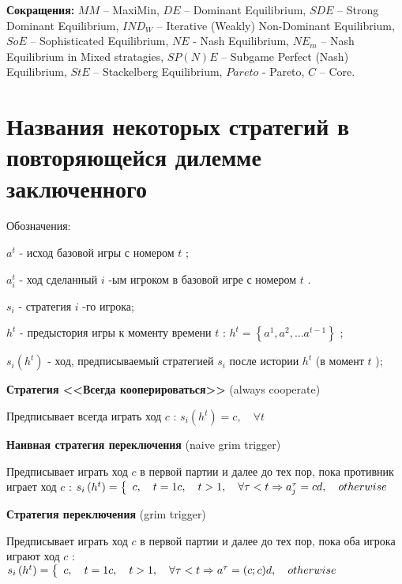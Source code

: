 \documentclass[pdftex,12pt,a4paper]{article}
\def\Par{Pareto} %
\begin{document}
{\bf Сокращения:}  $MM$ -- MaxiMin, $DE$ --
Dominant Equilibrium, $SDE$ -- Strong Dominant
Equilibrium, $IND_W$ -- Iterative (Weakly)
Non-Dominant Equilibrium,  $SoE$ -- Sophisticated
Equilibrium, $NE$ - Nash Equilibrium,  $NE_m$ --
Nash Equilibrium in Mixed stratagies, $SP(N)E$ --
Subgame Perfect (Nash) Equilibrium, $StE$ --
Stackelberg Equilibrium, $\Par$ - Pareto, $C$ --
Core. \vspace{2mm}






\section{Названия некоторых стратегий в повторяющейся дилемме заключенного} 

Обозначения:

 $a^{t} $  - исход базовой игры с номером  $t$ ;

 $a_{i}^{t} $  - ход сделанный  $i$ -ым игроком в базовой игре с номером  $t$ .

 $s_{i} $  - стратегия  $i$ -го игрока;

 $h^{t} $  - предыстория игры к моменту времени  $t$ :  $h^{t} =\left\{a^{1} ,a^{2} ,...a^{t-1} \right\}$ ;

 $s_{i} \left(h^{t} \right)$  - ход, предписываемый стратегией  $s_{i} $  после истории  $h^{t} $  (в момент  $t$ );

{\bf Стратегия <<Всегда кооперироваться>>} (always cooperate)

Предписывает всегда играть ход  $c$ :  $s_{i} \left(h^{t} \right)=c,\quad \forall t$

{\bf Наивная стратегия переключения} (naive grim trigger)

Предписывает играть ход  $c$  в первой партии и далее до тех пор, пока противник играет ход  $c$ :  $s_{i} \left(h^{t} \right)=\left\{\begin{array}{l} {c,\quad t=1} \par {c,\quad t>1,\quad \forall \tau <t\Rightarrow a_{j}^{\tau } =c} \par {d,\quad otherwise} \end{array}\right. $

{\bf Стратегия переключения} (grim trigger)

Предписывает играть ход  $c$  в первой партии и далее до тех пор, пока оба игрока играют ход  $c$ :  $s_{i} \left(h^{t} \right)=\left\{\begin{array}{l} {c,\quad t=1} \par {c,\quad t>1,\quad \forall \tau <t\Rightarrow a^{\tau } =\left(c;c\right)} \par {d,\quad otherwise} \end{array}\right. $
\end{document}
